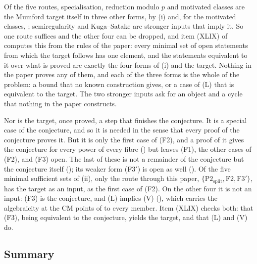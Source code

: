 \begin{remark}\label{rem:mumfordneeded}
Of the five routes, specialisation, reduction modulo $p$ and motivated
classes are the Mumford target itself in three other forms, by
(i) and, for the motivated classes,
; semiregularity and Kuga--Satake are stronger inputs
that imply it. So one route suffices and the other four can be dropped, and
item (XLIX) of  computes this from the rules of the
paper: every minimal set of open statements from which the target follows
has one element, and the statements equivalent to it over what is proved
are exactly the four forms of (i) and the target. Nothing in the paper
proves any of them, and each of the three forms is the whole of the problem:
a bound that no known construction gives, or a case of \textup{(L)} that is
equivalent to the target. The two stronger inputs ask for an object and a
cycle that nothing in the paper constructs.

Nor is the target, once proved, a step that finishes the conjecture. It is a
special case of the conjecture, and so it is needed in the sense that every
proof of the conjecture proves it. But it is only the first case of (F2), and
a proof of it gives the conjecture for every power of every fibre
() but leaves (F1), the other cases of (F2), and
(F3) open. The last
of these is not a remainder of the conjecture but the conjecture itself
(); its weaker form \textup{(F3$'$)} is open as well
(). Of the five minimal sufficient sets of
(ii), only the route through this paper,
$\{\mathrm{P2}_{\mathrm{split}},\mathrm{F2},\mathrm{F3}'\}$, has the target as an input,
as the first case of (F2). On the other four it is not an input: (F3) is the
conjecture, and \textup{(L)} implies \textup{(V)} (),
which carries the algebraicity at the CM points of  to
every member. Item (XLIX) checks both: that (F3), being equivalent to the
conjecture, yields the target, and that \textup{(L)} and \textup{(V)} do.
\end{remark}

\subsection{Summary}

